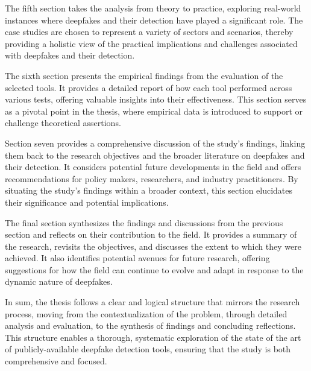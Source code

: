 The fifth section takes the analysis from theory to practice, exploring real-world instances 
where deepfakes and their detection have played a significant role. The case studies 
are chosen to represent a variety of sectors and scenarios, thereby providing a holistic 
view of the practical implications and challenges associated with deepfakes and their 
detection.

The sixth section presents the empirical findings from the evaluation of the selected tools. 
It provides a detailed report of how each tool performed across various tests, offering 
valuable insights into their effectiveness. This section serves as a pivotal point in the 
thesis, where empirical data is introduced to support or challenge theoretical assertions.

Section seven provides a comprehensive discussion of the study's findings, linking them back 
to the research objectives and the broader literature on deepfakes and their detection. 
It considers potential future developments in the field and offers recommendations for 
policy makers, researchers, and industry practitioners. By situating the study's findings 
within a broader context, this section elucidates their significance and potential 
implications.

The final section synthesizes the findings and discussions from the previous section and 
reflects on their contribution to the field. It provides a summary of the research, 
revisits the objectives, and discusses the extent to which they were achieved. It also 
identifies potential avenues for future research, offering suggestions for how the 
field can continue to evolve and adapt in response to the dynamic nature of deepfakes.

In sum, the thesis follows a clear and logical structure that mirrors the research 
process, moving from the contextualization of the problem, through detailed analysis 
and evaluation, to the synthesis of findings and concluding reflections. This structure 
enables a thorough, systematic exploration of the state of the art of publicly-available 
deepfake detection tools, ensuring that the study is both comprehensive and focused.
